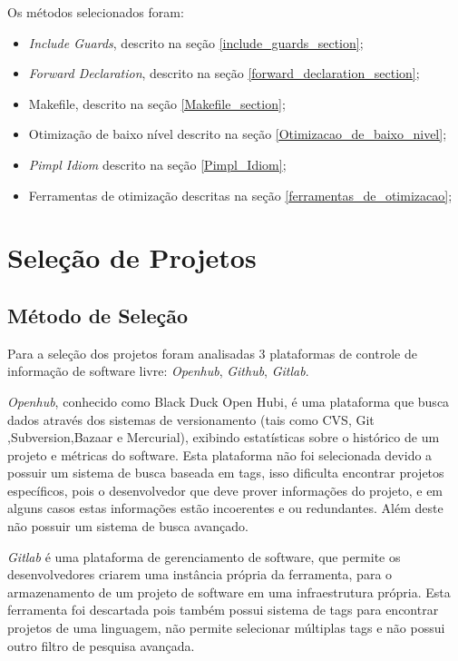 Os métodos selecionados foram:

\begin{itemize}
	\item \textit{Include Guards}, descrito na seção
 \ref{include_guards_section};
	\item \textit{Forward Declaration}, descrito na seção
 \ref{forward_declaration_section};
	\item Makefile, descrito na seção
 \ref{Makefile_section};
	\item Otimização de baixo nível descrito na seção
 \ref{Otimizacao_de_baixo_nivel};
	\item \textit{Pimpl Idiom} descrito na seção
 \ref{Pimpl_Idiom};
	\item Ferramentas de otimização descritas na seção
 \ref{ferramentas_de_otimizacao};
\end{itemize}

\section{Seleção de Projetos}

\subsection{Método de Seleção}

Para a seleção dos projetos foram analisadas 3 plataformas de controle de informação
de software livre: \textit{Openhub}, \textit{Github}, \textit{Gitlab}.

\textit{Openhub}, conhecido como Black Duck Open Hubi, é uma plataforma que busca dados através
 dos sistemas de versionamento (tais como CVS, Git ,Subversion,Bazaar e Mercurial),
 exibindo estatísticas sobre o histórico de um projeto e métricas do software.
 Esta plataforma não foi selecionada devido a possuir um sistema de busca baseada em tags,
 isso dificulta encontrar projetos específicos, pois o desenvolvedor que deve prover
 informações do projeto, e em alguns casos estas informações estão incoerentes e ou
 redundantes. Além deste não possuir um sistema de busca avançado.

\textit{Gitlab} é uma plataforma de gerenciamento de software, que permite os
 desenvolvedores criarem uma instância própria da ferramenta, para o armazenamento
 de um projeto de software em uma infraestrutura própria. Esta ferramenta foi
 descartada pois também possui sistema de tags para encontrar projetos de uma linguagem,
não permite selecionar múltiplas tags e não possui outro filtro de pesquisa avançada.

